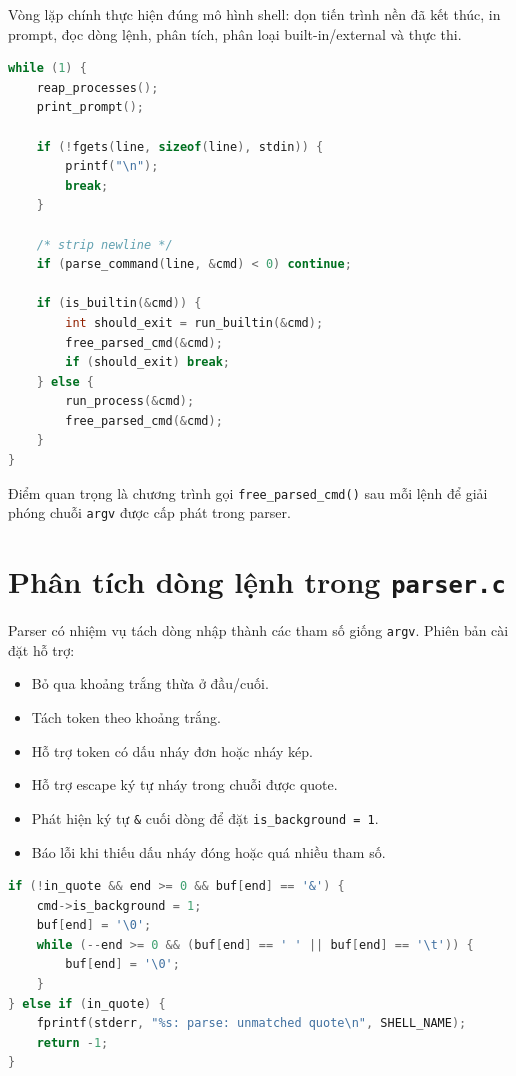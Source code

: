 \documentclass[13pt,a4paper,oneside]{extreport}
\begin{document}
Vòng lặp chính thực hiện đúng mô hình shell: dọn tiến trình nền đã kết thúc, in prompt, đọc dòng lệnh, phân tích, phân loại built-in/external và thực thi.

\begin{lstlisting}[language=C,caption={Rút gọn vòng lặp chính trong main.c}]
while (1) {
    reap_processes();
    print_prompt();

    if (!fgets(line, sizeof(line), stdin)) {
        printf("\n");
        break;
    }

    /* strip newline */
    if (parse_command(line, &cmd) < 0) continue;

    if (is_builtin(&cmd)) {
        int should_exit = run_builtin(&cmd);
        free_parsed_cmd(&cmd);
        if (should_exit) break;
    } else {
        run_process(&cmd);
        free_parsed_cmd(&cmd);
    }
}
\end{lstlisting}

Điểm quan trọng là chương trình gọi \texttt{free\_parsed\_cmd()} sau mỗi lệnh để giải phóng chuỗi \texttt{argv} được cấp phát trong parser.

\section{Phân tích dòng lệnh trong \texttt{parser.c}}

Parser có nhiệm vụ tách dòng nhập thành các tham số giống \texttt{argv}. Phiên bản cài đặt hỗ trợ:

\begin{itemize}[leftmargin=1.2cm]
	\item Bỏ qua khoảng trắng thừa ở đầu/cuối.
	\item Tách token theo khoảng trắng.
	\item Hỗ trợ token có dấu nháy đơn hoặc nháy kép.
	\item Hỗ trợ escape ký tự nháy trong chuỗi được quote.
	\item Phát hiện ký tự \texttt{\&} cuối dòng để đặt \texttt{is\_background = 1}.
	\item Báo lỗi khi thiếu dấu nháy đóng hoặc quá nhiều tham số.
\end{itemize}

\begin{lstlisting}[language=C,caption={Phát hiện background command ở cuối dòng}]
if (!in_quote && end >= 0 && buf[end] == '&') {
    cmd->is_background = 1;
    buf[end] = '\0';
    while (--end >= 0 && (buf[end] == ' ' || buf[end] == '\t')) {
        buf[end] = '\0';
    }
} else if (in_quote) {
    fprintf(stderr, "%s: parse: unmatched quote\n", SHELL_NAME);
    return -1;
}
\end{lstlisting}
\end{document}
